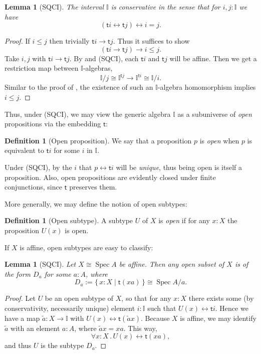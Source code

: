 \documentclass[12pt]{amsart}
\newtheorem{lemma}[theorem]{Lemma}
\theoremstyle{definition}
\newtheorem{definition}[theorem]{Definition}
\newcommand{\mbb}[1]{\mathbb{#1}}
\newcommand{\I}{\mbb I}
\newcommand{\ms}[1]{\mathsf{#1}}
\newcommand{\qsi}[1]{\tilde{#1}}
\newcommand{\scomp}[2]{\{\,#1\mid#2\,\}}
\newcommand{\fa}[2]{\forall #1\!\colon\!\!#2\mathpunct{.}}
\newcommand{\eq}{\leftrightarrow}
\newcommand{\spec}{\operatorname{Spec}}
\begin{document}
\begin{lemma}[SQCI]\label{lem:intconserve}
  The interval $\I$ is \emph{conservative} in the sense that for $i,j : \I$ we have
  \[ (\ms ti \eq \ms tj) \eq i = j. \]
\end{lemma}
\begin{proof}
  If $i \le j$ then trivially $\ms ti \to \ms tj$. Thus it suffices to show
  \[ (\ms ti \to \ms tj) \to i \le j. \]
  Take $i,j$ with $\ms ti \to \ms tj$. By  and (SQCI), each $\ms ti$ and $\ms tj$ will be affine. Then we get a restriction map between $\I$-algebras,
  \[ \I/j \cong \I^{\ms tj} \to \I^{\ms ti} \cong \I/i. \]
  Similar to the proof of , the existence of such an $\I$-algebra homomorphism implies $i \le j$. 
\end{proof}

Thus, under (SQCI), we may view the generic algebra $\I$ as a subuniverse of \emph{open} propositions via the embedding $\ms t$:

\begin{definition}[Open proposition]
  We say that a proposition $p$ is \emph{open} when $p$ is equivalent to $\ms ti$ for some $i$ in $\I$.
\end{definition}

Under (SQCI), by  the $i$ that $p \eq \ms ti$ will be \emph{unique}, thus being open is itself a proposition. Also, open propositions are evidently closed under finite conjunctions, since $\ms t$ preserves them. 

More generally, we may define the notion of open subtypes:

\begin{definition}[Open subtype]
  A subtype $U$ of $X$ is \emph{open} if for any $x:X$ the proposition $U(x)$ is open.
\end{definition}

If $X$ is affine, open subtypes are easy to classify:

\begin{lemma}[SQCI]\label{lem:openofaffinegivesalgebra}
  Let $X \cong \spec A$ be affine. Then any open subset of $X$ is of the form $D_a$ for some $a:A$, where
  \[ D_a := \scomp{x : X}{\ms t(xa)} \cong \spec A/a. \]
\end{lemma}
\begin{proof}
  Let $U$ be an open subtype of $X$, so that for any $x:X$ there exists some (by conservativity, necessarily unique) element $i:\I$ such that $U(x)\eq \ms ti$.
  Hence we have a map $\qsi a \colon X \to \I$ with $U(x) \eq \ms t(\qsi ax)$. Because $X$ is affine, we may identify $\qsi a$ with an element $a:A$, where $\qsi ax = xa$. This way,
  \[ \fa xX U(x) \eq \ms t(xa), \]
  and thus $U$ is the subtype $D_a$.
\end{proof}
\end{document}
